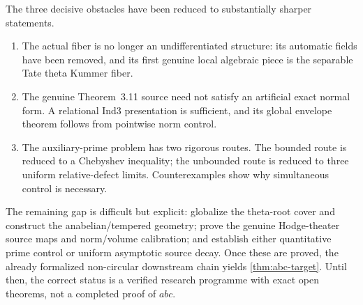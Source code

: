 \documentclass[11pt]{amsart}
\theoremstyle{definition}
\theoremstyle{remark}
\begin{document}
The three decisive obstacles have been reduced to substantially sharper
statements.

\begin{enumerate}[label=(\arabic*)]
\item The actual fiber is no longer an undifferentiated structure: its
automatic fields have been removed, and its first genuine local algebraic
piece is the separable Tate theta Kummer fiber.
\item The genuine Theorem~3.11 source need not satisfy an artificial exact
normal form.  A relational Ind3 presentation is sufficient, and its global
envelope theorem follows from pointwise norm control.
\item The auxiliary-prime problem has two rigorous routes.  The bounded route
is reduced to a Chebyshev inequality; the unbounded route is reduced to three
uniform relative-defect limits.  Counterexamples show why simultaneous
control is necessary.
\end{enumerate}

The remaining gap is difficult but explicit: globalize the theta-root cover
and construct the anabelian/tempered geometry; prove the genuine Hodge-theater
source maps and norm/volume calibration; and establish either quantitative
prime control or uniform asymptotic source decay.  Once these are proved, the
already formalized non-circular downstream chain yields
\cref{thm:abc-target}.  Until then, the correct status is a verified research
programme with exact open theorems, not a completed proof of $abc$.
\end{document}
